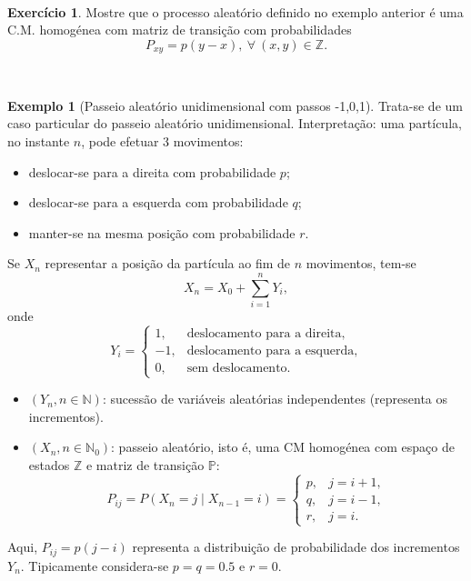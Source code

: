 \documentclass[
  11pt,
  a4paper,
]{book}
\providecommand{\tightlist}{%
  \setlength{\itemsep}{0pt}\setlength{\parskip}{0pt}}
\theoremstyle{definition}
\theoremstyle{definition}
\newtheorem{example}{Exemplo}[chapter]
\theoremstyle{definition}
\newtheorem{exercise}{Exercício}[chapter]
\theoremstyle{definition}
\theoremstyle{remark}
\begin{document}
\(\,\)

\begin{exercise}
\leavevmode

Mostre que o processo aleatório definido no exemplo anterior é uma C.M. homogénea com matriz de transição com probabilidades
\[P_{xy}=p(y-x), ~\forall ~(x,y) \in \mathbb{Z}.\]

\end{exercise}

\(\,\)

\begin{example}[Passeio aleatório unidimensional com passos -1,0,1]
Trata-se de um caso particular do passeio aleatório unidimensional. Interpretação: uma partícula, no instante \(n\), pode efetuar 3 movimentos:

\begin{itemize}
\tightlist
\item
  deslocar-se para a direita com probabilidade \(p\);
\item
  deslocar-se para a esquerda com probabilidade \(q\);
\item
  manter-se na mesma posição com probabilidade \(r\).
\end{itemize}

Se \(X_n\) representar a posição da partícula ao fim de \(n\) movimentos, tem-se
\[
X_n = X_0 + \sum_{i=1}^n Y_i,
\]
onde
\[
Y_i =
\begin{cases}
1, & \text{deslocamento para a direita},\\
-1, & \text{deslocamento para a esquerda},\\
0, & \text{sem deslocamento}.
\end{cases}
\]

\begin{itemize}
\tightlist
\item
  \((Y_n, n \in \mathbb{N})\): sucessão de variáveis aleatórias independentes (representa os incrementos).\\
\item
  \((X_n, n \in \mathbb{N}_0)\): passeio aleatório, isto é, uma CM homogénea com espaço de estados \(\mathbb{Z}\) e matriz de transição \(\mathbb{P}\):
  \[
  P_{ij} = P(X_n = j \mid X_{n-1}=i) =
  \begin{cases}
  p, & j=i+1,\\
  q, & j=i-1,\\
  r, & j=i.
  \end{cases}
  \]
\end{itemize}

Aqui, \(P_{ij}=p(j-i)\) representa a distribuição de probabilidade dos incrementos \(Y_n\). Tipicamente considera-se \(p=q=0.5\) e \(r=0\).
\end{example}
\end{document}
